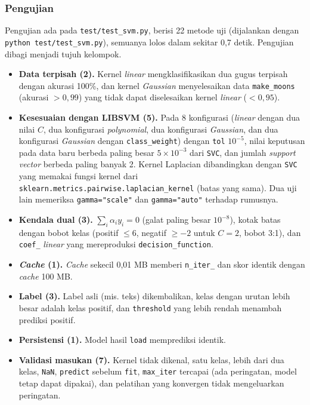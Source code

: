 \subsubsection{Pengujian}
\label{subsubsec:svm-uji}
Pengujian ada pada \nolinkurl{test/test_svm.py}, berisi 22 metode uji (dijalankan dengan \texttt{python}\ \nolinkurl{test/test_svm.py}), semuanya lolos dalam sekitar 0,7 detik. Pengujian dibagi menjadi tujuh kelompok.
\begin{itemize}
	\item \textbf{Data terpisah (2).} Kernel \textit{linear} mengklasifikasikan dua gugus terpisah dengan akurasi 100\%, dan kernel \textit{Gaussian} menyelesaikan data \texttt{make\_moons} (akurasi $> 0{,}99$) yang tidak dapat diselesaikan kernel \textit{linear} ($< 0{,}95$).
	\item \textbf{Kesesuaian dengan LIBSVM (5).} Pada 8 konfigurasi (\textit{linear} dengan dua nilai $C$, dua konfigurasi \textit{polynomial}, dua konfigurasi \textit{Gaussian}, dan dua konfigurasi \textit{Gaussian} dengan \texttt{class\_weight}) dengan \texttt{tol} $10^{-5}$, nilai keputusan pada data baru berbeda paling besar $5 \times 10^{-3}$ dari \texttt{SVC}, dan jumlah \textit{support vector} berbeda paling banyak 2. Kernel Laplacian dibandingkan dengan \texttt{SVC} yang memakai fungsi kernel dari \texttt{sklearn.metrics.pairwise.laplacian\_kernel} (batas yang sama). Dua uji lain memeriksa \texttt{gamma="scale"} dan \texttt{gamma="auto"} terhadap rumusnya.
	\item \textbf{Kendala dual (3).} $\sum_i \alpha_i y_i = 0$ (galat paling besar $10^{-8}$), kotak batas dengan bobot kelas (positif $\le 6$, negatif $\ge -2$ untuk $C = 2$, bobot 3:1), dan \texttt{coef\_} \textit{linear} yang mereproduksi \texttt{decision\_function}.
	\item \textbf{\textit{Cache} (1).} \textit{Cache} sekecil 0,01 MB memberi \texttt{n\_iter\_} dan skor identik dengan \textit{cache} 100 MB.
	\item \textbf{Label (3).} Label asli (mis. teks) dikembalikan, kelas dengan urutan lebih besar adalah kelas positif, dan \texttt{threshold} yang lebih rendah menambah prediksi positif.
	\item \textbf{Persistensi (1).} Model hasil \texttt{load} memprediksi identik.
	\item \textbf{Validasi masukan (7).} Kernel tidak dikenal, satu kelas, lebih dari dua kelas, \texttt{NaN}, \texttt{predict} sebelum \texttt{fit}, \texttt{max\_iter} tercapai (ada peringatan, model tetap dapat dipakai), dan pelatihan yang konvergen tidak mengeluarkan peringatan.
\end{itemize}
